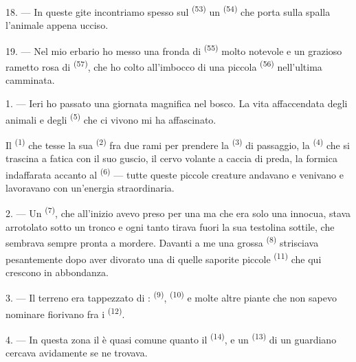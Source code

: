 18. --- In queste gite incontriamo spesso sul 
\textsuperscript{(53)} un  \textsuperscript{(54)} che
porta sulla spalla l'animale appena ucciso.

19. --- Nel mio erbario ho messo una fronda di  \textsuperscript{(55)}
molto notevole e un grazioso rametto rosa di  \textsuperscript{(57)},
che ho colto all'imbocco di una piccola  \textsuperscript{(56)}
nell'ultima camminata.

\VUsaut{3.0mm}
\VUsaut{3.0mm}

\VUsaut{3.0mm}

1. --- Ieri ho passato una giornata magnifica nel bosco. La vita affaccendata degli
animali e degli  \textsuperscript{(5)} che ci vivono mi ha affascinato.

Il  \textsuperscript{(1)} che tesse la sua 
\textsuperscript{(2)} fra due rami per prendere la 
\textsuperscript{(3)} di passaggio, la  \textsuperscript{(4)} che si
trascina a fatica con il suo guscio, il cervo volante a caccia di preda, la formica
indaffarata accanto al  \textsuperscript{(6)} --- tutte queste
piccole creature andavano e venivano e lavoravano con un'energia straordinaria.

2. --- Un  \textsuperscript{(7)}, che all'inizio avevo preso per una
 ma che era solo una  innocua, stava arrotolato sotto un
tronco e ogni tanto tirava fuori la sua testolina sottile, che sembrava sempre pronta a
mordere. Davanti a me una grossa  \textsuperscript{(8)}
strisciava pesantemente dopo aver divorato una di quelle saporite piccole
 \textsuperscript{(11)} che qui crescono in abbondanza.

3. --- Il terreno era tappezzato di :
 \textsuperscript{(9)},  \textsuperscript{(10)} e
molte altre piante che non sapevo nominare fiorivano fra i 
\textsuperscript{(12)}.

4. --- In questa zona il  è quasi comune quanto il 
\textsuperscript{(14)}, e un  \textsuperscript{(13)} di un guardiano
cercava avidamente se ne trovava.


